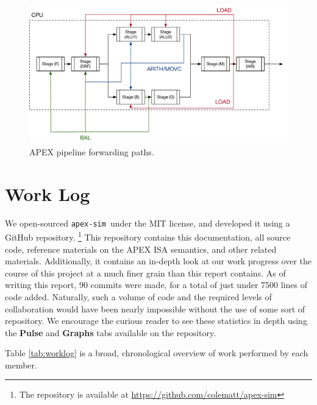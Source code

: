 \documentclass[12pt]{article}
\newcommand{\codename}[0]{\texttt{apex-sim}~}
\begin{document}
\begin{figure}
  \includegraphics[width=\linewidth]{./figs/apex-sim-forwarding.pdf}
  \caption{APEX pipeline forwarding paths.}
  \label{fig:forwarding}
\end{figure}

\section{Work Log}
\label{sec:worklog}
We open-sourced \codename under the MIT license, and developed it using a GitHub repository. \footnote{The repository is available at \url{https://github.com/colematt/apex-sim}}
This repository contains this documentation, all source code, reference materials on the APEX ISA semantics, and other related materials.
Additionally, it contains an in-depth look at our work progress over the course of this project at a much finer grain than this report contains.
As of writing this report, 90 commits were made, for a total of just under 7500 lines of code added.
Naturally, such a volume of code and the required levels of collaboration would have been nearly impossible without the use of some sort of repository.
We encourage the curious reader to see these statistics in depth using the \textbf{Pulse} and \textbf{Graphs} tabs available on the repository.

Table \ref{tab:worklog} is a broad, chronological overview of work performed by each member.
\end{document}
